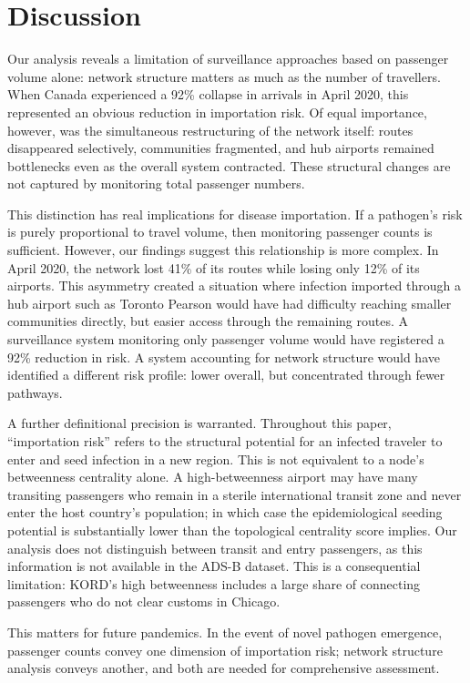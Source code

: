 \documentclass{elsarticle}
\begin{document}
\section{Discussion}

Our analysis reveals a limitation of surveillance approaches based on passenger volume alone: network structure matters as much as the number of travellers. When Canada experienced a 92\% collapse in arrivals in April 2020, this represented an obvious reduction in importation risk. Of equal importance, however, was the simultaneous restructuring of the network itself: routes disappeared selectively, communities fragmented, and hub airports remained bottlenecks even as the overall system contracted. These structural changes are not captured by monitoring total passenger numbers.

This distinction has real implications for disease importation. If a pathogen's risk is purely proportional to travel volume, then monitoring passenger counts is sufficient. However, our findings suggest this relationship is more complex. In April 2020, the network lost 41\% of its routes while losing only 12\% of its airports. This asymmetry created a situation where infection imported through a hub airport such as Toronto Pearson would have had difficulty reaching smaller communities directly, but easier access through the remaining routes. A surveillance system monitoring only passenger volume would have registered a 92\% reduction in risk. A system accounting for network structure would have identified a different risk profile: lower overall, but concentrated through fewer pathways.

A further definitional precision is warranted. Throughout this paper, ``importation risk'' refers to the structural potential for an infected traveler to enter and seed infection in a new region. This is not equivalent to a node's betweenness centrality alone. A high-betweenness airport may have many transiting passengers who remain in a sterile international transit zone and never enter the host country's population; in which case the epidemiological seeding potential is substantially lower than the topological centrality score implies. Our analysis does not distinguish between transit and entry passengers, as this information is not available in the ADS-B dataset. This is a consequential limitation: KORD's high betweenness includes a large share of connecting passengers who do not clear customs in Chicago. 

This matters for future pandemics. In the event of novel pathogen emergence, passenger counts convey one dimension of importation risk; network structure analysis conveys another, and both are needed for comprehensive assessment.
\end{document}

